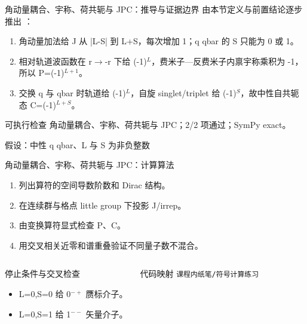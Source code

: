 \begin{frame}[t]{角动量耦合、宇称、荷共轭与 JPC：推导与证据边界}
\footnotesize
{}\quad 由本节定义与前置结论逐步推出 ：
\begin{enumerate}
\item 角动量加法给 J 从 |L-S| 到 L+S，每次增加 1；q qbar 的 S 只能为 0 或 1。
\item 相对轨道波函数在 r\ensuremath{\rightarrow}-r 下给 (-1)\ensuremath{^{L}}，费米子—反费米子内禀宇称乘积为 -1，所以 P=(-1)\ensuremath{^{L+1}}。
\item 交换 q 与 qbar 时轨道给 (-1)\ensuremath{^{L}}，自旋 singlet/\allowbreak{}triplet 给 (-1)\ensuremath{^{S}}，故中性自共轭态 C=(-1)\ensuremath{^{L+S}}。
\end{enumerate}\begin{block}{可执行检查}
\quad 角动量耦合、宇称、荷共轭与 JPC；2/2 项通过；SymPy exact。
\par\scriptsize 假设：中性 q qbar、L 与 S 为非负整数
\end{block}
\end{frame}

\begin{frame}[t]{角动量耦合、宇称、荷共轭与 JPC：计算算法}
\footnotesize
{}\begin{enumerate}
\item 列出算符的空间导数阶数和 Dirac 结构。
\item 在连续群与格点 little group 下投影 J/\allowbreak{}irrep。
\item 由变换算符显式检查 P、C。
\item 用交叉相关近零和谱重叠验证不同量子数不混合。
\end{enumerate}\begin{columns}[T,onlytextwidth]
\begin{block}{停止条件与交叉检查}\scriptsize\begin{itemize}
\item[\CheckMark] L=0,S=0 给 0\ensuremath{^{-+}} 赝标介子。
\item[\CheckMark] L=0,S=1 给 1\ensuremath{^{--}} 矢量介子。
\end{itemize}\end{block}
\begin{block}{代码映射}
\scriptsize \texttt{课程内纸笔/\allowbreak{}符号计算练习}
\end{block}\end{columns}\end{frame}

